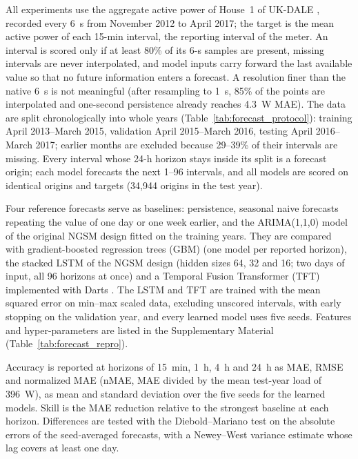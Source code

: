 \documentclass[fleqn,10pt]{wlscirep}
\begin{document}
All experiments use the aggregate active power of House~1 of UK-DALE \cite{Kelly2015ukdale}, recorded every 6~s from November 2012 to April 2017; the target is the mean active power of each 15-min interval, the reporting interval of the meter. An interval is scored only if at least 80\% of its 6-s samples are present, missing intervals are never interpolated, and model inputs carry forward the last available value so that no future information enters a forecast. A resolution finer than the native 6~s is not meaningful (after resampling to 1~s, 85\% of the points are interpolated and one-second persistence already reaches 4.3~W MAE). The data are split chronologically into whole years (Table~\ref{tab:forecast_protocol}): training April 2013--March 2015, validation April 2015--March 2016, testing April 2016--March 2017; earlier months are excluded because 29--39\% of their intervals are missing. Every interval whose 24-h horizon stays inside its split is a forecast origin; each model forecasts the next 1--96 intervals, and all models are scored on identical origins and targets (34{,}944 origins in the test year).


Four reference forecasts serve as baselines: persistence, seasonal naive forecasts repeating the value of one day or one week earlier, and the ARIMA(1,1,0) model of the original NGSM design fitted on the training years. They are compared with gradient-boosted regression trees (GBM) \cite{Ke2017lightgbm, Pedregosa2011sklearn} (one model per reported horizon), the stacked LSTM of the NGSM design (hidden sizes 64, 32 and 16; two days of input, all 96 horizons at once) and a Temporal Fusion Transformer (TFT) \cite{Lim2021tft} implemented with Darts \cite{Herzen2022darts}. The LSTM and TFT are trained with the mean squared error on min--max scaled data, excluding unscored intervals, with early stopping on the validation year, and every learned model uses five seeds. Features and hyper-parameters are listed in the Supplementary Material (Table~\ref{tab:forecast_repro}).

Accuracy is reported at horizons of 15~min, 1~h, 4~h and 24~h as MAE, RMSE and normalized MAE (nMAE, MAE divided by the mean test-year load of 396~W), as mean and standard deviation over the five seeds for the learned models. Skill is the MAE reduction relative to the strongest baseline at each horizon. Differences are tested with the Diebold--Mariano test \cite{Diebold1995} on the absolute errors of the seed-averaged forecasts, with a Newey--West variance estimate \cite{Newey1987} whose lag covers at least one day.
\end{document}
